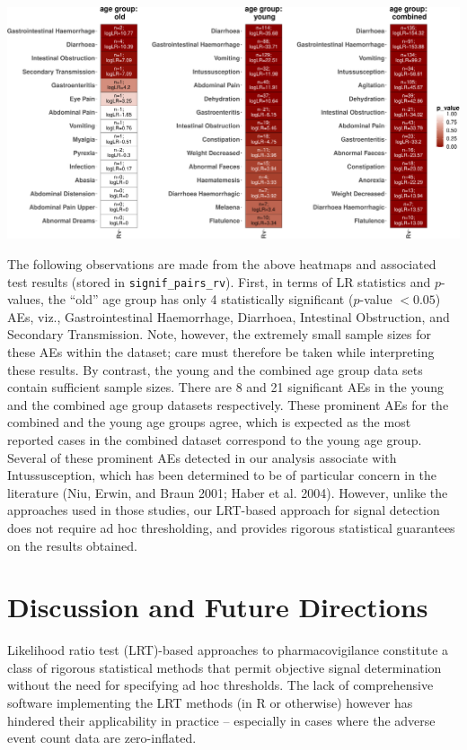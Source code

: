 \begin{center}\includegraphics[width=1\linewidth]{RJ-2023-027_files/figure-latex/heatmap-rv-all-1} \end{center}

The following observations are made from the above heatmaps and associated test results (stored in \texttt{signif\_pairs\_rv}). First, in terms of LR statistics and \(p\)-values, the ``old'' age group has only 4 statistically significant (\(p\)-value \(< 0.05\)) AEs, viz., Gastrointestinal Haemorrhage, Diarrhoea, Intestinal Obstruction, and Secondary Transmission. Note, however, the extremely small sample sizes for these AEs within the dataset; care must therefore be taken while interpreting these results. By contrast, the young and the combined age group data sets contain sufficient sample sizes. There are 8 and 21 significant AEs in the young and the combined age group datasets respectively. These prominent AEs for the combined and the young age groups agree, which is expected as the most reported cases in the combined dataset correspond to the young age group. Several of these prominent AEs detected in our analysis associate with Intussusception, which has been determined to be of particular concern in the literature (Niu, Erwin, and Braun 2001; Haber et al. 2004). However, unlike the approaches used in those studies, our LRT-based approach for signal detection does not require ad hoc thresholding, and provides rigorous statistical guarantees on the results obtained.

\hypertarget{discussion-and-future-directions}{%
\section{Discussion and Future Directions}\label{discussion-and-future-directions}}

Likelihood ratio test (LRT)-based approaches to pharmacovigilance constitute a class of rigorous statistical methods that permit objective signal determination without the need for specifying ad hoc thresholds. The lack of comprehensive software implementing the LRT methods (in R or otherwise) however has hindered their applicability in practice -- especially in cases where the adverse event count data are zero-inflated.

